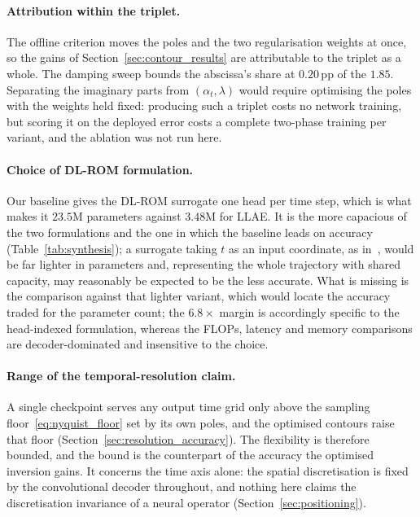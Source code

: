 ﻿\documentclass[a4paper,12pt]{article}
\theoremstyle{definition}
\theoremstyle{remark}
\begin{document}
\paragraph{Attribution within the triplet.}
The offline criterion moves the poles and the two regularisation weights at once, so the gains of Section~\ref{sec:contour_results} are attributable to the triplet as a whole. The damping sweep bounds the abscissa's share at $0.20$\,pp of the $1.85$. Separating the imaginary parts from $(\alpha_t, \lambda)$ would require optimising the poles with the weights held fixed: producing such a triplet costs no network training, but scoring it on the deployed error costs a complete two-phase training per variant, and the ablation was not run here.

\paragraph{Choice of DL-ROM formulation.}
Our baseline gives the DL-ROM surrogate one head per time step, which is what makes it $23.5$M parameters against $3.48$M for LLAE. It is the more capacious of the two formulations and the one in which the baseline leads on accuracy (Table~\ref{tab:synthesis}); a surrogate taking $t$ as an input coordinate, as in~\cite{fresca2021}, would be far lighter in parameters and, representing the whole trajectory with shared capacity, may reasonably be expected to be the less accurate. What is missing is the comparison against that lighter variant, which would locate the accuracy traded for the parameter count; the $6.8\times$ margin is accordingly specific to the head-indexed formulation, whereas the FLOPs, latency and memory comparisons are decoder-dominated and insensitive to the choice.

\paragraph{Range of the temporal-resolution claim.}
A single checkpoint serves any output time grid only above the sampling floor~\eqref{eq:nyquist_floor} set by its own poles, and the optimised contours raise that floor (Section~\ref{sec:resolution_accuracy}). The flexibility is therefore bounded, and the bound is the counterpart of the accuracy the optimised inversion gains. It concerns the time axis alone: the spatial discretisation is fixed by the convolutional decoder throughout, and nothing here claims the discretisation invariance of a neural operator (Section~\ref{sec:positioning}).
\end{document}
